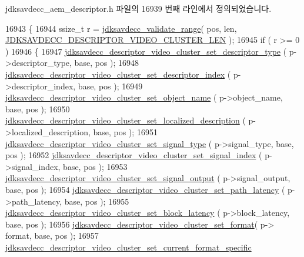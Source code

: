 jdksavdecc\+\_\+aem\+\_\+descriptor.\+h 파일의 16939 번째 라인에서 정의되었습니다.


\begin{DoxyCode}
16943 \{
16944     ssize\_t r = \hyperlink{group__util_ga9c02bdfe76c69163647c3196db7a73a1}{jdksavdecc\_validate\_range}( pos, len, 
      \hyperlink{group__descriptor__video__cluster_gad9866f1282631e70b01a84c6a9bf5187}{JDKSAVDECC\_DESCRIPTOR\_VIDEO\_CLUSTER\_LEN} );
16945     \textcolor{keywordflow}{if} ( r >= 0 )
16946     \{
16947         \hyperlink{group__descriptor__video__cluster_ga937a1bf521614cc618340be195c4c1b9}{jdksavdecc\_descriptor\_video\_cluster\_set\_descriptor\_type}
      ( p->descriptor\_type, base, pos );
16948         \hyperlink{group__descriptor__video__cluster_gadc22d84cebba0d2ce4e296e9e872d02e}{jdksavdecc\_descriptor\_video\_cluster\_set\_descriptor\_index}
      ( p->descriptor\_index, base, pos );
16949         \hyperlink{group__descriptor__video__cluster_gae35f2549412a84852b99c1adf5ad9353}{jdksavdecc\_descriptor\_video\_cluster\_set\_object\_name}
      ( p->object\_name, base, pos );
16950         \hyperlink{group__descriptor__video__cluster_gae27b06526ad86b745c3643dbcd40db4b}{jdksavdecc\_descriptor\_video\_cluster\_set\_localized\_description}
      ( p->localized\_description, base, pos );
16951         \hyperlink{group__descriptor__video__cluster_ga38c932f394384b621cf1ba26782afaf8}{jdksavdecc\_descriptor\_video\_cluster\_set\_signal\_type}
      ( p->signal\_type, base, pos );
16952         \hyperlink{group__descriptor__video__cluster_gaf9788ed501b587bd8eafafc5f0ee4aef}{jdksavdecc\_descriptor\_video\_cluster\_set\_signal\_index}
      ( p->signal\_index, base, pos );
16953         \hyperlink{group__descriptor__video__cluster_ga13e1589dbef4200d5797925a07cbd512}{jdksavdecc\_descriptor\_video\_cluster\_set\_signal\_output}
      ( p->signal\_output, base, pos );
16954         \hyperlink{group__descriptor__video__cluster_ga7c718a1bd2c4b0a9577dafc5c11cb573}{jdksavdecc\_descriptor\_video\_cluster\_set\_path\_latency}
      ( p->path\_latency, base, pos );
16955         \hyperlink{group__descriptor__video__cluster_ga1ac3418ff127705510f8af413f5678d1}{jdksavdecc\_descriptor\_video\_cluster\_set\_block\_latency}
      ( p->block\_latency, base, pos );
16956         \hyperlink{group__descriptor__video__cluster_ga38fb4d45f49979e22c2199655252037d}{jdksavdecc\_descriptor\_video\_cluster\_set\_format}( p->
      format, base, pos );
16957         \hyperlink{group__descriptor__video__cluster_gaba5f5bf958ce581ac4e700805b16b377}{jdksavdecc\_descriptor\_video\_cluster\_set\_current\_format\_specific}

\end{DoxyCode}

